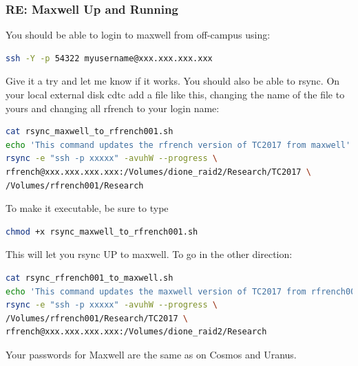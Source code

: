 \documentclass[crop=false,class=book]{standalone}
\begin{document}
\subsubsection{\footnotesize RE: Maxwell Up and Running}
You should be able to login to maxwell from off-campus using:
\begin{lstlisting}[language=bash,basicstyle=\footnotesize]
ssh -Y -p 54322 myusername@xxx.xxx.xxx.xxx
\end{lstlisting}
Give it a try and let me know if it works. 
You should also be able to rsync. On your local external disk
cdtc
add a file like this, changing the name of the file to yours and changing all rfrench to your login name:
\begin{lstlisting}[language=bash,basicstyle=\footnotesize]
cat rsync_maxwell_to_rfrench001.sh
echo 'This command updates the rfrench version of TC2017 from maxwell'
rsync -e "ssh -p xxxxx" -avuhW --progress \
rfrench@xxx.xxx.xxx.xxx:/Volumes/dione_raid2/Research/TC2017 \
/Volumes/rfrench001/Research
\end{lstlisting}
To make it executable, be sure to type
\begin{lstlisting}[language=bash,basicstyle=\footnotesize]
chmod +x rsync_maxwell_to_rfrench001.sh
\end{lstlisting}
This will let you rsync UP to maxwell. To go in the other direction:
\begin{lstlisting}[language=bash,basicstyle=\footnotesize]
cat rsync_rfrench001_to_maxwell.sh
echo 'This command updates the maxwell version of TC2017 from rfrench001'
rsync -e "ssh -p xxxxx" -avuhW --progress \
/Volumes/rfrench001/Research/TC2017 \
rfrench@xxx.xxx.xxx.xxx:/Volumes/dione_raid2/Research
\end{lstlisting}
Your passwords for Maxwell are the same as on Cosmos and Uranus.
\end{document}
